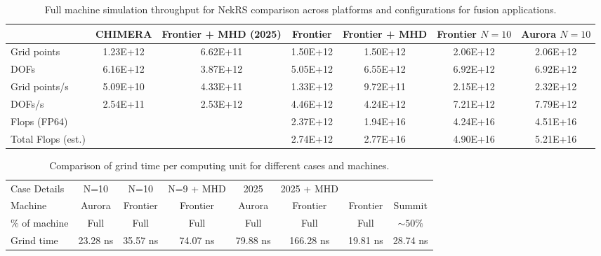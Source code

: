 \begin{table}
\footnotesize
\setlength{\tabcolsep}{4pt}
\renewcommand{\arraystretch}{1.1}
\centering
\begin{tabular}{|l|c|c|c|c|c|c|}
\hline
\textbf{} &
\textbf{CHIMERA} \cite{sc24} &
\textbf{Frontier + MHD (2025)} &
\textbf{Frontier } &
\textbf{Frontier + MHD  } &
\textbf{Frontier $N=10$ } &
\textbf{Aurora $N=10$} \\
\hline
Grid points           & 1.23E+12       & 6.62E+11      & 1.50E+12      & 1.50E+12 & 2.06E+12 & 2.06E+12   \\
DOFs                  & 6.16E+12       & 3.87E+12      & 5.05E+12      & 6.55E+12 & 6.92E+12 & 6.92E+12   \\
Grid points/s         & 5.09E+10       & 4.33E+11      & 1.33E+12      & 9.72E+11 & 2.15E+12 & 2.32E+12   \\
DOFs/s                & 2.54E+11       & 2.53E+12      & 4.46E+12      & 4.24E+12 & 7.21E+12 & 7.79E+12   \\
Flops (FP64)          &                &               & 2.37E+12      & 1.94E+16 & 4.24E+16 & 4.51E+16   \\
Total Flops (est.)    &                &               & 2.74E+12      & 2.77E+16 & 4.90E+16 & 5.21E+16   \\
\hline
\end{tabular}
\caption{Full machine simulation throughput for NekRS comparison across platforms and configurations for fusion applications.}
\label{tab:simulation_metrics}
\end{table}

\begin{table}
\footnotesize
\setlength{\tabcolsep}{4pt}
\renewcommand{\arraystretch}{1.1}
\centering
\begin{tabular}{|l|c|c|c|c|c|c|c|}
\hline
Case Details & N=10 & N=10 & N=9 + MHD & 2025 & 2025 + MHD & \cite{gatech1} & \cite{gatech2} \\
Machine & Aurora & Frontier & Frontier & Aurora & Frontier & Frontier & Summit \\
\% of machine & Full & Full & Full & Full & Full & Full & $\sim 50\%$ \\
Grind time  & 23.28 ns & 35.57 ns & 74.07 ns & 79.88 ns & 166.28 ns & 19.81 ns & 28.74 ns \\
\hline
\end{tabular}
\caption{Comparison of grind time per computing unit for different cases and machines.}
\label{tab:grind}
\end{table}


